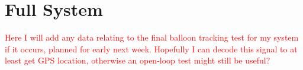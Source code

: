 \section{Full System}

\textcolor{red}{Here I will add any data relating to the final balloon tracking test for my system if it occurs, planned for early next week. Hopefully I can decode this signal to at least get GPS location, otherwise an open-loop test might still be useful?}
